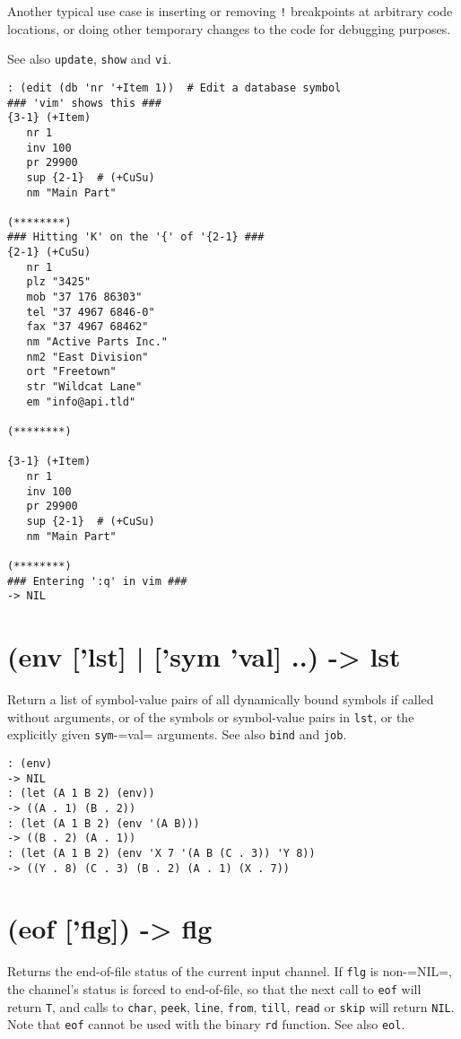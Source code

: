 {{{{{Another typical use case is inserting or removing \texttt{!} breakpoints at
arbitrary code locations, or doing other temporary changes to the code
for debugging purposes.

See also \texttt{update}, \texttt{show} and \texttt{vi}.


\begin{verbatim}
: (edit (db 'nr '+Item 1))  # Edit a database symbol
### 'vim' shows this ###
{3-1} (+Item)
   nr 1
   inv 100
   pr 29900
   sup {2-1}  # (+CuSu)
   nm "Main Part"

(********)
### Hitting 'K' on the '{' of '{2-1} ###
{2-1} (+CuSu)
   nr 1
   plz "3425"
   mob "37 176 86303"
   tel "37 4967 6846-0"
   fax "37 4967 68462"
   nm "Active Parts Inc."
   nm2 "East Division"
   ort "Freetown"
   str "Wildcat Lane"
   em "info@api.tld"

(********)

{3-1} (+Item)
   nr 1
   inv 100
   pr 29900
   sup {2-1}  # (+CuSu)
   nm "Main Part"

(********)
### Entering ':q' in vim ###
-> NIL
\end{verbatim}

 
\section{(env ['lst] | ['sym 'val] ..) -> lst}
\label{sec-8-1-5-7}


Return a list of symbol-value pairs of all dynamically bound symbols if
called without arguments, or of the symbols or symbol-value pairs in
\texttt{lst}, or the explicitly given \texttt{sym}-=val= arguments. See also \texttt{bind}
and \texttt{job}.


\begin{verbatim}
: (env)
-> NIL
: (let (A 1 B 2) (env))
-> ((A . 1) (B . 2))
: (let (A 1 B 2) (env '(A B)))
-> ((B . 2) (A . 1))
: (let (A 1 B 2) (env 'X 7 '(A B (C . 3)) 'Y 8))
-> ((Y . 8) (C . 3) (B . 2) (A . 1) (X . 7))
\end{verbatim}

 
\section{(eof ['flg]) -> flg}
\label{sec-8-1-5-8}


Returns the end-of-file status of the current input channel. If \texttt{flg} is
non-=NIL=, the channel's status is forced to end-of-file, so that the
next call to \texttt{eof} will return \texttt{T}, and calls to \texttt{char}, \texttt{peek}, \texttt{line},
\texttt{from}, \texttt{till}, \texttt{read} or \texttt{skip} will return \texttt{NIL}. Note that \texttt{eof}
cannot be used with the binary \texttt{rd} function. See also \texttt{eol}.


}}}}}

